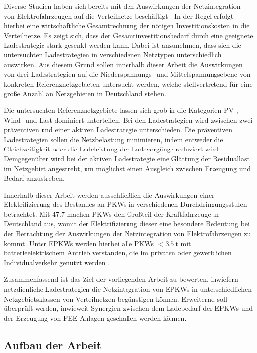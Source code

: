Diverse Studien haben sich bereits mit den Auswirkungen der Netzintegration von Elektrofahrzeugen auf die Verteilnetze beschäftigt \cite{Agora2019} \cite{DEAGH2018} \cite{BCG2018}.
In der Regel erfolgt hierbei eine wirtschaftliche Gesamtrechnung der nötigen Investitionskosten in die Verteilnetze.
Es zeigt sich, dass der Gesamtinvestitionsbedarf durch eine geeignete Ladestrategie stark gesenkt werden kann.
Dabei ist anzunehmen, dass sich die untersuchten Ladestrategien in verschiedenen Netztypen unterschiedlich auswirken.
Aus diesem Grund sollen innerhalb dieser Arbeit die Auswirkungen von drei Ladestrategien auf die Niederspannungs- und Mittelspannungsebene von konkreten Referenznetzgebieten untersucht werden, welche stellvertretend für eine große Anzahl an Netzgebieten in Deutschland stehen.\medskip

Die untersuchten Referenznetzgebiete lassen sich grob in die Kategorien \gls{PV}-, Wind- und Last-dominiert unterteilen.
Bei den Ladestrategien wird zwischen zwei präventiven und einer aktiven Ladestrategie unterschieden.
Die präventiven Ladestrategien sollen die Netzbelastung minimieren, indem entweder die Gleichzeitigkeit oder die Ladeleistung der Ladevorgänge reduziert wird.
Demgegenüber wird bei der aktiven Ladestrategie eine Glättung der Residuallast im Netzgebiet angestrebt, um möglichst einen Ausgleich zwischen Erzeugung und Bedarf anzustreben.\medskip

Innerhalb dieser Arbeit werden ausschließlich die Auswirkungen einer Elektrifizierung des Bestandes an \glspl{PKW} in verschiedenen Durchdringungsstufen betrachtet.
Mit \SI{47.7}{\MioFZs} \cite{KBA2020a} machen \glspl{PKW} den Großteil der Kraftfahrzeuge in Deutschland aus, womit der Elektrifizierung dieser eine besondere Bedeutung bei der Betrachtung der Auswirkungen der Netzintegration von Elektrofahrzeugen zu kommt.
Unter \glspl{EPKW} werden hierbei alle \glspl{PKW} \(<\!\SI{3.5}{\tonne}\) mit batterieelektrischem Antrieb verstanden, die im privaten oder gewerblichen Individualverkehr genutzt werden \cite{BNetzA2020}. \medskip

Zusammenfassend ist das Ziel der vorliegenden Arbeit zu bewerten, inwiefern netzdienliche Ladestrategien die Netzintegration von \glspl{EPKW} in unterschiedlichen Netzgebietsklassen von Verteilnetzen begünstigen können.
Erweiternd soll überprüft werden, inwieweit Synergien zwischen dem Ladebedarf der \glspl{EPKW} und der Erzeugung von \gls{FEE} Anlagen geschaffen werden können.


\subsection{Aufbau der Arbeit}


